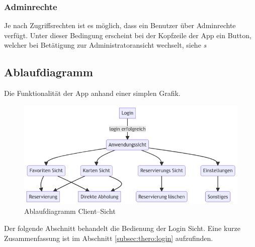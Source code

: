 \newpage

\subsubsection{Adminrechte}
Je nach Zugriffsrechten ist es möglich, dass ein Benutzer über Adminrechte verfügt. Unter dieser Bedingung erscheint bei der Kopfzeile der App ein Button, welcher bei Betätigung zur Administratoransicht wechselt, siehe {\textit{s}}

\subsection{Ablaufdiagramm}
Die Funktionalität der App anhand einer simplen Grafik.
\begin{figure}[h]
\centering
\includegraphics[width=1.0\textwidth]{FLUTTER/images/GP/mermaid-client.png}
\caption{Ablaufdiagramm Client–Sicht}
\end{figure}

\newpage
{}\label{sec:userguider:loginview}
Der folgende Abschnitt behandelt die Bedienung der Login Sicht. Eine kurze Zusammenfassung ist im Abschnitt \ref{subsec:thero:login}  aufzufinden.

